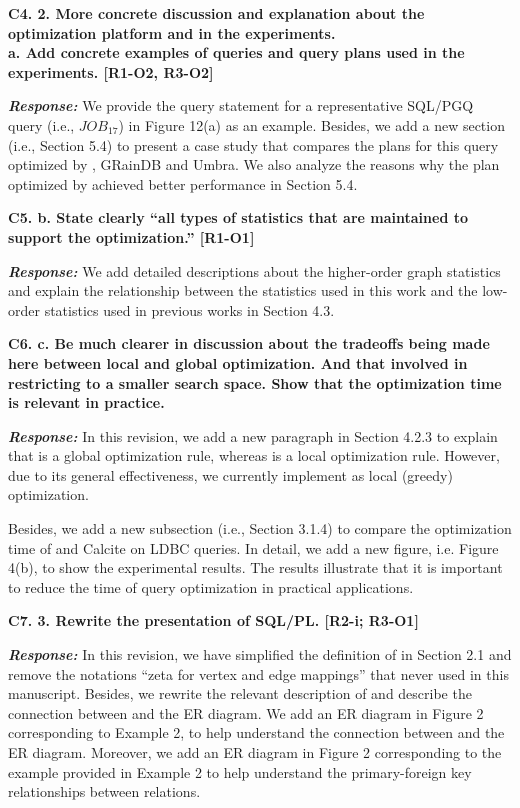 \textbf{
C4. 2. More concrete discussion and explanation about the optimization platform and in the experiments. \\
a. Add concrete examples of queries and query plans used in the experiments. [R1-O2, R3-O2]
}

\textbf{\textit{Response: }}
We provide the query statement for a representative SQL/PGQ query (i.e., $JOB_{17}$) in Figure 12(a) as an example.
Besides, we add a new section (i.e., Section 5.4) to present a case study that compares the plans for this query optimized by \name, GRainDB and Umbra.
We also analyze the reasons why the plan optimized by \name achieved better performance in Section 5.4.


\textbf{
C5. b. State clearly “all types of statistics that are maintained to support the optimization.” [R1-O1]}

\textbf{\textit{Response: }}
We add detailed descriptions about the higher-order graph statistics and explain the relationship between the statistics used in this work and the low-order statistics used in previous works in Section 4.3.


\textbf{
C6. c. Be much clearer in discussion about the tradeoffs being made here between local and global optimization. And that involved in restricting to a smaller search space. Show that the optimization time is relevant in practice.}

\textbf{\textit{Response: }}
In this revision, we add a new paragraph in Section 4.2.3 to explain that \filterrule is a global optimization rule, whereas \fusionrule is a local optimization rule. However, due to its general effectiveness, we currently implement \filterrule as local (greedy) optimization.

Besides, we add a new subsection (i.e., Section 3.1.4) to compare the optimization time of \name and Calcite on LDBC queries.
In detail, we add a new figure, i.e. Figure 4(b), to show the experimental results.
The results illustrate that it is important to reduce the time of query optimization in practical applications.


\textbf{
C7. 3. Rewrite the presentation of SQL/PL. [R2-i; R3-O1]
}

\textbf{\textit{Response: }}
In this revision, we have simplified the definition of \rgmapping in Section 2.1 and remove the notations ``zeta for vertex and edge mappings'' that never used in this manuscript.
Besides, we rewrite the relevant description of \rgmapping and describe the connection between \rgmapping and the ER diagram.
We add an ER diagram in Figure 2 corresponding to Example 2, to help understand the connection between \rgmapping and the ER diagram.
Moreover, we add an ER diagram in Figure 2 corresponding to the example provided in Example 2 to help understand the primary-foreign key relationships between relations.
